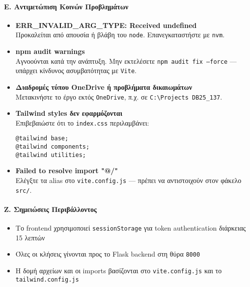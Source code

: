 \documentclass[13pt]{extarticle}
\begin{document}
\paragraph{Ε. Αντιμετώπιση Κοινών Προβλημάτων}
\begin{itemize}
    \item \textbf{ERR\_INVALID\_ARG\_TYPE: Received undefined} \\
    Προκαλείται από απουσία ή βλάβη του \texttt{node}. Επανεγκαταστήστε με \texttt{nvm}.

    \item \textbf{npm audit warnings} \\
    Αγνοούνται κατά την ανάπτυξη. Μην εκτελέσετε \texttt{npm audit fix --force} — υπάρχει κίνδυνος ασυμβατότητας με \texttt{Vite}.

    \item \textbf{Διαδρομές τύπου OneDrive ή προβλήματα δικαιωμάτων} \\
    Μετακινήστε το έργο εκτός \texttt{OneDrive}, π.χ. σε \texttt{C:\textbackslash Projects\ DB25\_137}.

    \item \textbf{Tailwind styles δεν εφαρμόζονται} \\
    Επιβεβαιώστε ότι το \texttt{index.css} περιλαμβάνει:
\begin{verbatim}
@tailwind base;
@tailwind components;
@tailwind utilities;
\end{verbatim}

    \item \textbf{Failed to resolve import "@/"} \\
    Ελέγξτε τα alias στο \texttt{vite.config.js} — πρέπει να αντιστοιχούν στον φάκελο \texttt{src/}.
\end{itemize}

\paragraph{Ζ. Σημειώσεις Περιβάλλοντος}
\begin{itemize}
    \item Το frontend χρησιμοποιεί \texttt{sessionStorage} για token authentication διάρκειας 15 λεπτών
    \item Όλες οι κλήσεις γίνονται προς το Flask backend στη θύρα \texttt{8000}
    \item Η δομή αρχείων και οι imports βασίζονται στο \texttt{vite.config.js} και το \texttt{tailwind.config.js}
\end{itemize}
\end{document}
